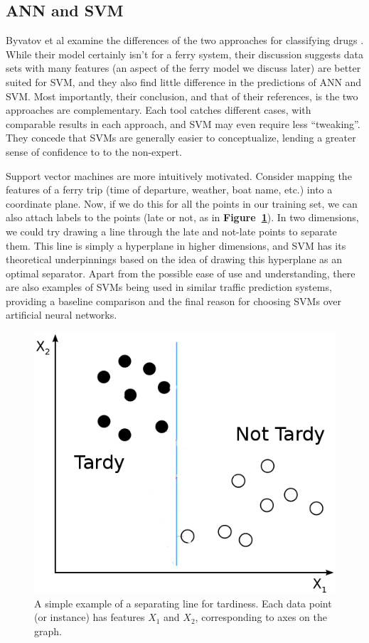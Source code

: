 \documentclass[11pt]{article} %
\begin{document}
\subsection{ANN and SVM}
\label{sec:ann_svm}
Byvatov et al examine the differences of the two approaches for classifying drugs
\cite{byvatov2003comparison}. While their model certainly isn't for a ferry 
system, their discussion suggests data sets with many features (an aspect of the 
ferry model we discuss later) are better suited for SVM, and they also find little
difference in the predictions of ANN and SVM. Most importantly, their conclusion,
and that of their references, is the two approaches are complementary. Each 
tool catches different cases, with comparable results in each approach,
and SVM may even require less ``tweaking''. They concede that SVMs are generally
easier to conceptualize, lending a greater sense of confidence to to the 
non-expert.

Support vector machines are more intuitively motivated. Consider mapping the
features of a ferry trip (time of departure, weather, boat name, etc.) into a
coordinate plane.  Now, if we do this for all the points in our training set,
we can also attach labels to the points (late or not, as in 
\textbf{Figure~\ref{fig:basic_svm_data}}). In two dimensions, we
could try drawing a line through the late and not-late points to separate them.
This line is simply a hyperplane in higher dimensions, and SVM has its theoretical
underpinnings based on the idea of drawing this hyperplane as an optimal separator. 
Apart from the possible ease of use and understanding, there are also examples of 
SVMs being used in similar traffic prediction systems, providing a baseline 
comparison and the final reason for choosing SVMs over artificial neural networks.

\begin{figure}[h]
  \centering
  \includegraphics[scale=.5]{images/basic_svm_data.png}
  \caption{A simple example of a separating line for tardiness. 
      Each data point (or instance) has features $X_1$ and $X_2$, corresponding
      to axes on the graph.}
  \label{fig:basic_svm_data}
\end{figure}
\end{document}
